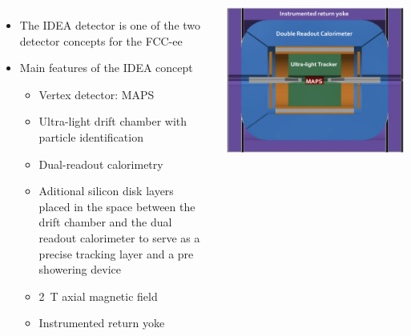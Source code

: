 \documentclass[final,xcolor={dvipsnames,svgnames,x11names,table}]{beamer}
\begin{document}
\begin{frame}
\begin{textblock}{83}
\begin{tcolorbox}[title=The IDEA detector concept for FCC-ee]
  \begin{columns}
      \begin{itemize}
        \item The IDEA detector is one of the two detector concepts for the FCC-ee \vspace{0.5cm}
        \item Main features of the IDEA concept \vspace{0.5cm}
          \begin{itemize}
            \item Vertex detector: MAPS \vspace{0.2cm}
            \item Ultra-light drift chamber with particle identification \vspace{0.2cm}
            \item Dual-readout calorimetry \vspace{0.2cm}
            \item Aditional silicon disk layers placed in the space between the drift chamber and the dual readout calorimeter to serve as a precise tracking layer and a pre showering device \vspace{0.2cm}
            \item 2~T axial magnetic field \vspace{0.2cm}
            \item Instrumented return yoke \vspace{0.2cm}
          \end{itemize}
      \end{itemize}


      \centering
      \includegraphics[width=\textwidth]{../figures/FCCeeIDEAConcept}


\end{columns}
\end{tcolorbox}
\end{textblock}
\end{frame}
\end{document}
